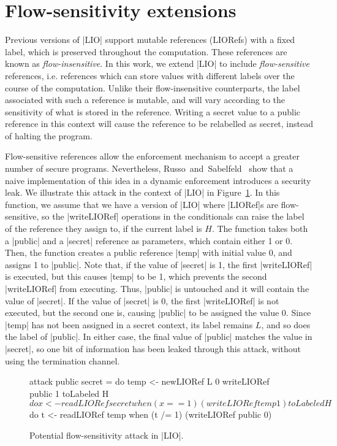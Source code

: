 \section{Flow-sensitivity extensions}
\label{sec:flow-sensitive}

Previous versions of |LIO| support mutable references (LIORefs) with a
fixed label, which is preserved throughout the computation. These
references are known as \emph{flow-insensitive}. In this work, we
extend |LIO| to include \emph{flow-sensitive} references,
i.e. references which can store values with different labels over the
course of the computation. Unlike their flow-insensitive counterparts,
the label associated with such a reference is mutable, and will vary
according to the sensitivity of what is stored in the
reference. Writing a secret value to a public reference in this
context will cause the reference to be relabelled as secret, instead
of halting the program.

Flow-sensitive references allow the enforcement mechanism to accept a
greater number of secure programs. Nevertheless,
Russo~and~Sabelfeld~\citep{?} show that a naive implementation of this
idea in a dynamic enforcement introduces a security leak. We
illustrate this attack in the context of |LIO| in
Figure~\ref{fig:fs-attack}. In this function, we assume that we have a
version of |LIO| where |LIORef|s are flow-sensitive, so the
|writeLIORef| operations in the conditionals can raise the label of
the reference they assign to, if the current label is $H$. The
function takes both a |public| and a |secret| reference as parameters,
which contain either 1 or 0. Then, the function creates a public
reference |temp| with initial value 0, and assigns 1 to |public|.
Note that, if the value of |secret| is 1, the first |writeLIORef| is
executed, but this causes |temp| to be 1, which prevents the second
|writeLIORef| from executing. Thus, |public| is untouched and it will
contain the value of |secret|. If the value of |secret| is 0, the
first |writeLIORef| is not executed, but the second one is, causing
|public| to be assigned the value 0. Since |temp| has not been
assigned in a secret context, its label remains $L$, and so does the
label of |public|. In either case, the final value of |public| matches
the value in |secret|, so one bit of information has been leaked
through this attack, without using the termination channel.

\begin{figure}[!ht]
\vspace*{-5pt}
\begin{code}
attack public secret = 
  do  temp    <- newLIORef L 0
      writeLIORef public 1
      toLabeled H $ do
        x <- readLIORef secret
        when (x == 1) (writeLIORef temp 1)
      toLabeled H $ do
        t <- readLIORef temp
        when (t /= 1) (writeLIORef public 0)
\end{code}
\caption{Potential flow-sensitivity attack in |LIO|.\label{fig:fs-attack}}
\vspace*{-5pt}
\end{figure}

